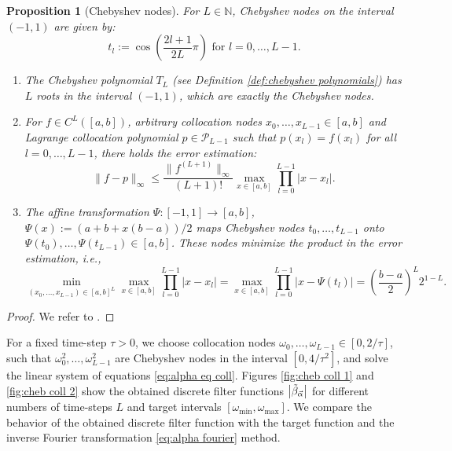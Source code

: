\documentclass[a4paper,11pt,bibliography=totoc,listof=totoc,headinclude=true,cleardoublepage=empty,oneside]{scrbook}
\newtheorem{prop}[theorem]{Proposition}
\newcommand{\N}{\mathbb{N}}
\newcommand{\dffv}{\Tilde{\beta}_{\Vec{\alpha}}}
\begin{document}
\begin{prop}[Chebyshev nodes] \label{def:chebyshev nodes}
    For $L\in\N$, Chebyshev nodes on the interval $(-1, 1)$ are given by:
    \begin{equation*}
        t_l := \cos\left(\frac{2l+1}{2L}\pi\right) \text{ for } l = 0, \dots, L-1.
    \end{equation*}
    \begin{enumerate}
        \item The Chebyshev polynomial $T_L$ (see Definition \ref{def:chebyshev polynomials}) has $L$ roots in the interval $(-1, 1)$, which are exactly the Chebyshev nodes.
        \item For $f \in C^{L}\left([a,b]\right)$, arbitrary collocation nodes $x_0, \dots, x_{L-1} \in [a,b]$ and Lagrange collocation polynomial $p\in \mathcal{P}_{L-1}$ such that $p(x_l) = f(x_l)$ for all $l=0, \dots, L-1$, there holds the error estimation:
        \begin{equation}\label{eq:lagrange error est}
            \|f-p\|_\infty \leqslant \frac{\|f^{(L+1)}\|_\infty}{(L+1)!} \max_{x\in[a,b]} \prod_{l=0}^{L-1} \left|x-x_l\right|.
        \end{equation}
        \item The affine transformation $\Psi: [-1, 1] \rightarrow [a,b]$, $\Psi(x) := \left(a+b+x(b-a)\right)/2$ maps Chebyshev nodes $t_0, \dots, t_{L-1}$ onto $\Psi(t_0), \dots, \Psi(t_{L-1}) \in [a,b]$. These nodes minimize the product in the error estimation, i.e.,
        \begin{equation*}
            \min_{(x_0, \dots, x_{L-1})\in [a,b]^L}  \max_{x\in[a,b]} \prod_{l=0}^{L-1} \left|x-x_l\right| =  \max_{x\in[a,b]} \prod_{l=0}^{L-1} \left|x-\Psi(t_l)\right| = \left(\frac{b-a}{2}\right)^{L} 2^{1-L}.
        \end{equation*}
    \end{enumerate}
\end{prop}
\begin{proof}
    We refer to \cite[p. 23--24]{numericsAB}.
\end{proof}

For a fixed time-step $\tau>0$, we choose collocation nodes $\omega_0, \dots, \omega_{L-1} \in \left[0, 2/\tau\right]$, such that $\omega_0^2, \dots, \omega_{L-1}^2$ are Chebyshev nodes in the interval $\left[0, 4/\tau^2\right]$, and solve the linear system of equations \eqref{eq:alpha eq coll}. Figures \ref{fig:cheb coll 1} and \ref{fig:cheb coll 2} show the obtained discrete filter functions $\left|\dffv\right|$ for different numbers of time-steps $L$ and target intervals $\left[\omega_{\min}, \omega_{\max} \right]$. We compare the behavior of the obtained discrete filter function with the target function and the inverse Fourier transformation \eqref{eq:alpha fourier} method.
\end{document}
